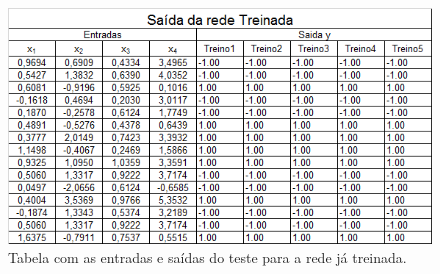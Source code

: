 \begin{figure}[H]
	\centering
	\includegraphics[scale = 1]{imagens/saida}
	\caption{Tabela com as entradas e saídas do teste para a rede já treinada.}
\end{figure}